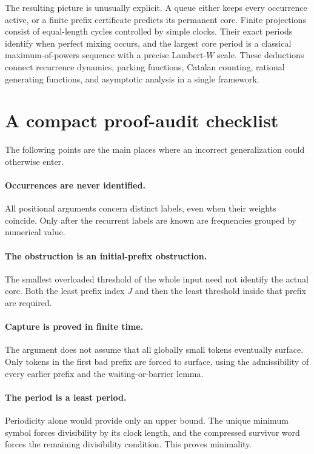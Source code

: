 \documentclass[11pt,letterpaper]{article}
\theoremstyle{definition}
\begin{document}
The resulting picture is unusually explicit. A queue either keeps every
occurrence active, or a finite prefix certificate predicts its permanent
core. Finite projections consist of equal-length cycles controlled by simple
clocks. Their exact periods identify when perfect mixing occurs, and the
largest core period is a classical maximum-of-powers sequence with a precise
Lambert-$W$ scale. These deductions connect recurrence dynamics, parking
functions, Catalan counting, rational generating functions, and asymptotic
analysis in a single framework.

\appendix
\section{A compact proof-audit checklist}\label{app:audit}
The following points are the main places where an incorrect generalization
could otherwise enter.

\paragraph{Occurrences are never identified.}
All positional arguments concern distinct labels, even when their weights
coincide. Only after the recurrent labels are known are frequencies grouped
by numerical value.

\paragraph{The obstruction is an initial-prefix obstruction.}
The smallest overloaded threshold of the whole input need not identify the
actual core. Both the least prefix index $J$ and then the least threshold
inside that prefix are required.

\paragraph{Capture is proved in finite time.}
The argument does not assume that all globally small tokens eventually
surface. Only tokens in the first bad prefix are forced to surface, using
the admissibility of every earlier prefix and the waiting-or-barrier lemma.

\paragraph{The period is a least period.}
Periodicity alone would provide only an upper bound. The unique minimum
symbol forces divisibility by its clock length, and the compressed survivor
word forces the remaining divisibility condition. This proves minimality.
\end{document}
